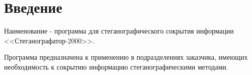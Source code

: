 \section{Введение}

Наименование - программа для стеганографического сокрытия информации <<Стеганографатор-2000>>.

Программа предназначена к применению в подразделениях заказчика, имеющих необходимость к сокрытию информацию стеганографическими методами.